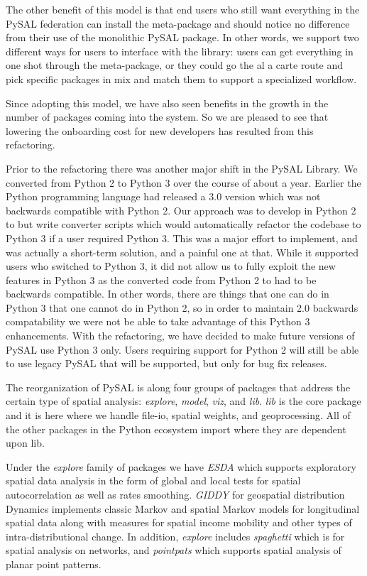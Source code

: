 \documentclass[11pt]{article}
\begin{document}
The other benefit of this model is that end users who still want everything in
the PySAL federation can install the meta-package and should notice no
difference from their use of the monolithic PySAL package. In other words, we
support two different ways for users to interface with the library: users can
get everything in one shot through the meta-package, or they could go the al a
carte route and pick specific packages in mix and match them to support a
specialized workflow.

Since adopting this model, we have also seen benefits in the growth in the number
of packages coming into the system. So we are pleased to see that  lowering the
onboarding cost for new developers has resulted from this refactoring.


Prior to the refactoring there was another major shift in the PySAL Library. We
converted from Python 2 to Python 3 over the course of about a year. Earlier the
Python programming language had released a 3.0 version which was not backwards
compatible with Python 2. Our approach was to develop in Python 2 to but write
converter scripts which would automatically refactor the codebase to Python 3
if a user required Python 3. This was a major effort to implement, and was
actually a short-term solution, and a painful one at that. While it supported
users who switched to Python 3, it did not allow us to fully exploit the new
features in Python 3 as the converted code from Python 2 to had to be backwards
compatible. In other words, there are things that one can do in Python 3 that
one cannot do in Python 2, so in order to maintain 2.0 backwards compatability
we were not be able to take advantage of this Python 3 enhancements. With the
refactoring, we have decided to make future versions of PySAL use Python 3 only. Users
requiring support for Python 2 will still be able to use legacy PySAL that
will be supported, but only for bug fix releases.


The reorganization of PySAL is along four groups of packages that address the
certain type of spatial analysis: \emph{explore}, \emph{model}, \emph{viz}, and \emph{lib}. \emph{lib} is the core
package and it is here where we handle file-io, spatial weights, and
geoprocessing. All of the other packages in the Python ecosystem import where
they are dependent upon lib.

Under the \emph{explore} family of packages we have \emph{ESDA} which supports exploratory
spatial data analysis in the form of global and local tests for spatial
autocorrelation as well as rates smoothing. \emph{GIDDY} for geospatial distribution
Dynamics implements classic Markov and spatial Markov models for longitudinal
spatial data along with measures for spatial income mobility and other types of
intra-distributional change. In addition, \emph{explore} includes \emph{spaghetti} which is
for spatial analysis on networks, and \emph{pointpats} which supports spatial analysis
of planar point patterns.
\end{document}
